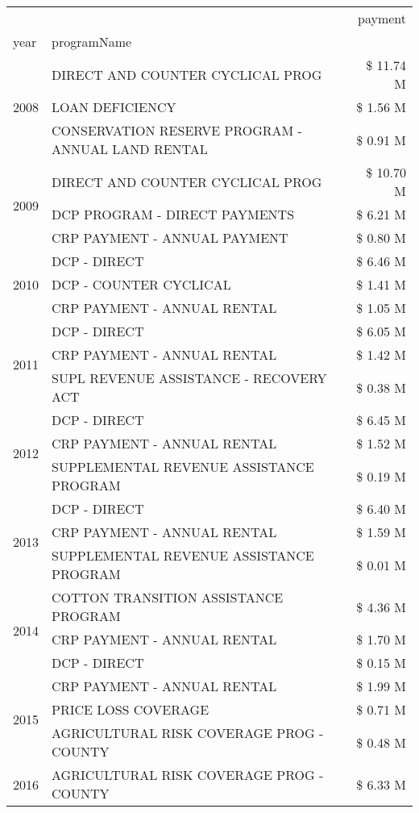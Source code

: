\begin{tabular}{llr}
\toprule
 &  & payment \\
year & programName &  \\
\midrule
\multirow[t]{3}{*}{2008} & DIRECT AND COUNTER CYCLICAL PROG & \$ 11.74 M \\
 & LOAN DEFICIENCY & \$ 1.56 M \\
 & CONSERVATION RESERVE PROGRAM - ANNUAL LAND RENTAL & \$ 0.91 M \\
\cline{1-3}
\multirow[t]{3}{*}{2009} & DIRECT AND COUNTER CYCLICAL PROG & \$ 10.70 M \\
 & DCP PROGRAM - DIRECT PAYMENTS & \$ 6.21 M \\
 & CRP PAYMENT - ANNUAL PAYMENT & \$ 0.80 M \\
\cline{1-3}
\multirow[t]{3}{*}{2010} & DCP - DIRECT & \$ 6.46 M \\
 & DCP - COUNTER CYCLICAL & \$ 1.41 M \\
 & CRP PAYMENT - ANNUAL RENTAL & \$ 1.05 M \\
\cline{1-3}
\multirow[t]{3}{*}{2011} & DCP - DIRECT & \$ 6.05 M \\
 & CRP PAYMENT - ANNUAL RENTAL & \$ 1.42 M \\
 & SUPL REVENUE ASSISTANCE - RECOVERY ACT & \$ 0.38 M \\
\cline{1-3}
\multirow[t]{3}{*}{2012} & DCP - DIRECT & \$ 6.45 M \\
 & CRP PAYMENT - ANNUAL RENTAL & \$ 1.52 M \\
 & SUPPLEMENTAL REVENUE ASSISTANCE PROGRAM & \$ 0.19 M \\
\cline{1-3}
\multirow[t]{3}{*}{2013} & DCP - DIRECT & \$ 6.40 M \\
 & CRP PAYMENT - ANNUAL RENTAL & \$ 1.59 M \\
 & SUPPLEMENTAL REVENUE ASSISTANCE PROGRAM & \$ 0.01 M \\
\cline{1-3}
\multirow[t]{3}{*}{2014} & COTTON TRANSITION ASSISTANCE PROGRAM & \$ 4.36 M \\
 & CRP PAYMENT - ANNUAL RENTAL & \$ 1.70 M \\
 & DCP - DIRECT & \$ 0.15 M \\
\cline{1-3}
\multirow[t]{3}{*}{2015} & CRP PAYMENT - ANNUAL RENTAL & \$ 1.99 M \\
 & PRICE LOSS COVERAGE & \$ 0.71 M \\
 & AGRICULTURAL RISK COVERAGE PROG - COUNTY & \$ 0.48 M \\
\cline{1-3}
\multirow[t]{3}{*}{2016} & AGRICULTURAL RISK COVERAGE PROG - COUNTY & \$ 6.33 M \\

\end{tabular}

